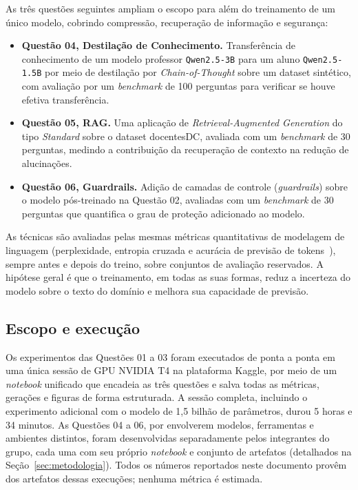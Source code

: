 As três questões seguintes ampliam o escopo para além do treinamento de um único
modelo, cobrindo compressão, recuperação de informação e segurança:

\begin{itemize}[leftmargin=2.2em]
  \item \textbf{Questão 04, Destilação de Conhecimento.} Transferência de
        conhecimento de um modelo professor \texttt{Qwen2.5-3B} para um aluno
        \texttt{Qwen2.5-1.5B} por meio de destilação por \textit{Chain-of-Thought}
        sobre um dataset sintético, com avaliação por um \textit{benchmark} de 100
        perguntas para verificar se houve efetiva transferência.
  \item \textbf{Questão 05, RAG.} Uma aplicação de \textit{Retrieval-Augmented
        Generation} do tipo \textit{Standard} sobre o dataset docentesDC, avaliada
        com um \textit{benchmark} de 30 perguntas, medindo a contribuição da
        recuperação de contexto na redução de alucinações.
  \item \textbf{Questão 06, Guardrails.} Adição de camadas de controle
        (\textit{guardrails}) sobre o modelo pós-treinado na Questão 02, avaliadas
        com um \textit{benchmark} de 30 perguntas que quantifica o grau de proteção
        adicionado ao modelo.
\end{itemize}

As técnicas são avaliadas pelas mesmas métricas quantitativas de modelagem de
linguagem (perplexidade, entropia cruzada e acurácia de previsão de
tokens~\cite{jelinek1977perplexity}), sempre antes e depois do treino, sobre
conjuntos de avaliação reservados. A hipótese geral é que o treinamento, em todas
as suas formas, reduz a incerteza do modelo sobre o texto do domínio e melhora sua
capacidade de previsão.

\subsection{Escopo e execução}

Os experimentos das Questões 01 a 03 foram executados de ponta a ponta em uma única
sessão de GPU NVIDIA T4 na plataforma Kaggle, por meio de um \textit{notebook}
unificado que encadeia as três questões e salva todas as métricas, gerações e
figuras de forma estruturada. A sessão completa, incluindo o experimento adicional
com o modelo de 1,5 bilhão de parâmetros, durou 5 horas e 34 minutos. As Questões 04
a 06, por envolverem modelos, ferramentas e ambientes distintos, foram desenvolvidas
separadamente pelos integrantes do grupo, cada uma com seu próprio \textit{notebook}
e conjunto de artefatos (detalhados na Seção~\ref{sec:metodologia}). Todos os números
reportados neste documento provêm dos artefatos dessas execuções; nenhuma métrica é
estimada.
